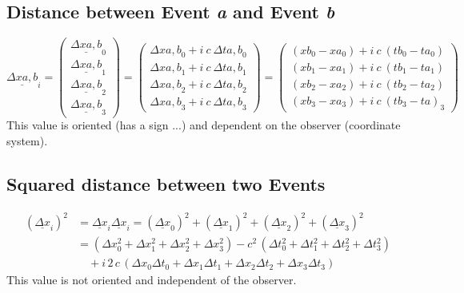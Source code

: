 \documentclass[]{article}
\begin{document}
\subsection{Distance between Event \textit{a} and Event \textit{b}}
\begin{equation}
\underline{\Delta x{\scriptstyle a,b}}_i
=
\begin{pmatrix}
	\underline{{\scriptstyle \Delta}x{\scriptstyle a,b}}_0\\
	\underline{{\scriptstyle \Delta}x{\scriptstyle a,b}}_1\\
	\underline{{\scriptstyle \Delta}x{\scriptstyle a,b}}_2\\
	\underline{{\scriptstyle \Delta}x{\scriptstyle a,b}}_3
\end{pmatrix}
=
\begin{pmatrix}
	{\scriptstyle \Delta}x{\scriptstyle a,b}_0 + i\ c\ {\scriptstyle \Delta}t{\scriptstyle a,b}_0\\
	{\scriptstyle \Delta}x{\scriptstyle a,b}_1 + i\ c\ {\scriptstyle \Delta}t{\scriptstyle a,b}_1\\
	{\scriptstyle \Delta}x{\scriptstyle a,b}_2 + i\ c\ {\scriptstyle \Delta}t{\scriptstyle a,b}_2\\
	{\scriptstyle \Delta}x{\scriptstyle a,b}_3 + i\ c\ {\scriptstyle \Delta}t{\scriptstyle a,b}_3
\end{pmatrix}
=
\begin{pmatrix}
	(x{\scriptstyle b}_0-x{\scriptstyle a}_0) + i\ c\ (t{\scriptstyle b}_0-t{\scriptstyle a}_0)\\
	(x{\scriptstyle b}_1-x{\scriptstyle a}_1) + i\ c\ (t{\scriptstyle b}_1-t{\scriptstyle a}_1)\\
	(x{\scriptstyle b}_2-x{\scriptstyle a}_2) + i\ c\ (t{\scriptstyle b}_2-t{\scriptstyle a}_2)\\
	(x{\scriptstyle b}_3-x{\scriptstyle a}_3) + i\ c\ (t{\scriptstyle b}_3-t{\scriptstyle a})_3
\end{pmatrix}
\end{equation}
This value is oriented (has a sign ...) and dependent on the observer (coordinate system).

\subsection{Squared distance between two Events}
\begin{equation}
\begin{split}
(\underline{\Delta x}_i)^2
&=
\underline{\Delta x}_i \underline{\Delta x}_i
=
(\underline{\Delta x}_0)^2 +
(\underline{\Delta x}_1)^2 +
(\underline{\Delta x}_2)^2 +
(\underline{\Delta x}_3)^2
\\%
&=
(\Delta x_0^2+\Delta x_1^2+\Delta x_2^2+\Delta x_3^2)
- c^2\,(\Delta t_0^2+\Delta t_1^2+\Delta t_2^2+\Delta t_3^2)
\\%
&\quad + i\, 2\, c\, (\Delta x_0 \Delta t_0 + \Delta x_1 \Delta t_1 +\Delta x_2 \Delta t_2 +\Delta x_3 \Delta t_3)
\end{split}
\end{equation}
This value is not oriented and independent of the observer.
\end{document}
